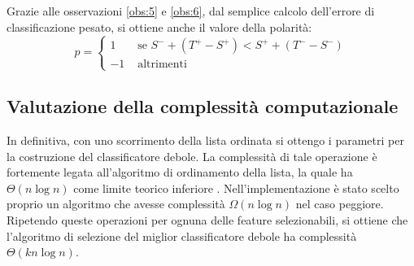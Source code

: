             Grazie alle osservazioni \ref{obs:5} e \ref{obs:6}, dal semplice calcolo dell'errore di classificazione pesato, si ottiene anche il valore della polarità:
            \begin{equation}
                p = \begin{cases}
                1 & \text{ se } S^- + (T^+ - S^+) < S^+ + (T^- - S^-) \\
                -1 & \text{ altrimenti }
            \end{cases}
            \end{equation}

        \subsection{Valutazione della complessità computazionale}
            In definitiva, con uno scorrimento della lista ordinata si ottengo i parametri per la costruzione del classificatore debole. La complessità di tale operazione è fortemente legata all'algoritmo di ordinamento della lista, la quale ha $\Theta(n\log n)$ come limite teorico inferiore \cite[p. 167]{Cormen09}. Nell'implementazione è stato scelto proprio un algoritmo che avesse complessità $\Omega(n\log n)$ nel caso peggiore. Ripetendo queste operazioni per ognuna delle feature selezionabili, si ottiene che l'algoritmo di selezione del miglior classificatore debole ha complessità $\Theta(kn\log n)$.

